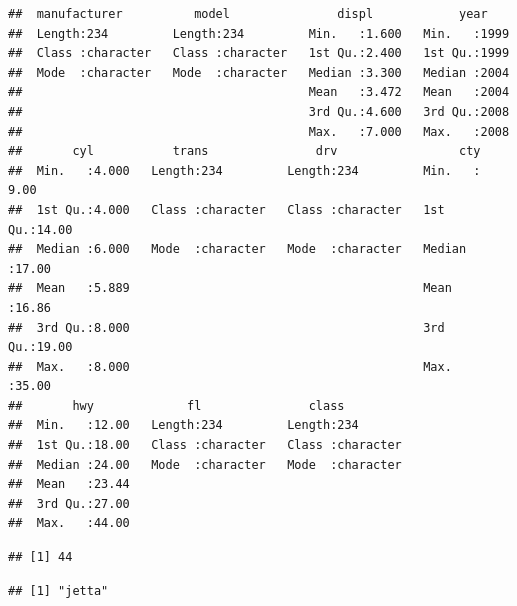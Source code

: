 \documentclass[
]{article}
\newenvironment{Shaded}{\begin{snugshade}}{\end{snugshade}}
\newcommand{\CommentTok}[1]{\textcolor[rgb]{0.56,0.35,0.01}{\textit{#1}}}
\newcommand{\FunctionTok}[1]{\textcolor[rgb]{0.13,0.29,0.53}{\textbf{#1}}}
\newcommand{\NormalTok}[1]{#1}
\newcommand{\OtherTok}[1]{\textcolor[rgb]{0.56,0.35,0.01}{#1}}
\newcommand{\SpecialCharTok}[1]{\textcolor[rgb]{0.81,0.36,0.00}{\textbf{#1}}}
\begin{document}
\begin{verbatim}
##  manufacturer          model               displ            year     
##  Length:234         Length:234         Min.   :1.600   Min.   :1999  
##  Class :character   Class :character   1st Qu.:2.400   1st Qu.:1999  
##  Mode  :character   Mode  :character   Median :3.300   Median :2004  
##                                        Mean   :3.472   Mean   :2004  
##                                        3rd Qu.:4.600   3rd Qu.:2008  
##                                        Max.   :7.000   Max.   :2008  
##       cyl           trans               drv                 cty       
##  Min.   :4.000   Length:234         Length:234         Min.   : 9.00  
##  1st Qu.:4.000   Class :character   Class :character   1st Qu.:14.00  
##  Median :6.000   Mode  :character   Mode  :character   Median :17.00  
##  Mean   :5.889                                         Mean   :16.86  
##  3rd Qu.:8.000                                         3rd Qu.:19.00  
##  Max.   :8.000                                         Max.   :35.00  
##       hwy             fl               class          
##  Min.   :12.00   Length:234         Length:234        
##  1st Qu.:18.00   Class :character   Class :character  
##  Median :24.00   Mode  :character   Mode  :character  
##  Mean   :23.44                                        
##  3rd Qu.:27.00                                        
##  Max.   :44.00
\end{verbatim}

\begin{Shaded}
\end{Shaded}

\begin{verbatim}
## [1] 44
\end{verbatim}

\begin{Shaded}
\end{Shaded}

\begin{verbatim}
## [1] "jetta"
\end{verbatim}
\end{document}
